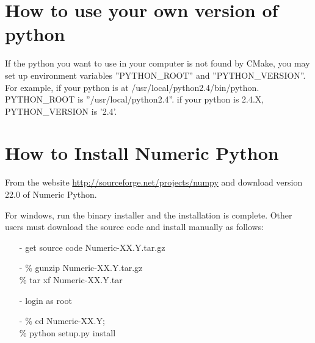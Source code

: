 \section{How to use your own version of python}

   If the python you want to use in your computer is not found by CMake,
    you may set up environment variables ''PYTHON\_ROOT'' and
    ''PYTHON\_VERSION''. For example, if your python is at
    /usr/local/python2.4/bin/python. PYTHON\_ROOT is
    ''/usr/local/python2.4''. if your python is 2.4.X, PYTHON\_VERSION
    is '2.4'.

\section{How to Install Numeric Python}
   From the website
    \href{http://sourceforge.net/projects/numpy}{http://sourceforge.net/projects/numpy}
    and download 
    version 22.0 of Numeric Python.
 
    For windows, run the binary installer and the installation is
    complete.  Other users must download the source code and install
    manually as follows:

    \begin{itemize}
    \item[-] get source code Numeric-XX.Y.tar.gz
    \item[-] \% gunzip Numeric-XX.Y.tar.gz \\
      \% tar xf Numeric-XX.Y.tar
    \item[-] login as root
    \item[-] \% cd Numeric-XX.Y; \\
      \% python setup.py install
    \end{itemize}



%